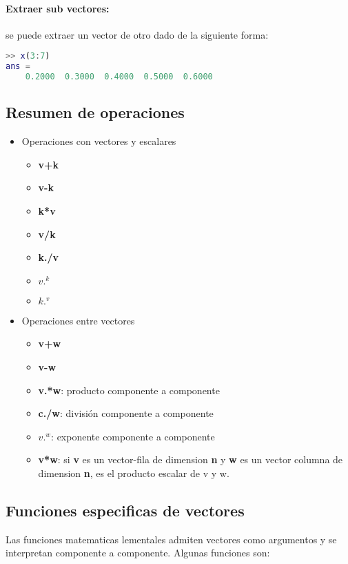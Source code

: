 \paragraph{Extraer sub vectores:} se puede extraer un vector de otro dado de la siguiente forma:
\begin{lstlisting}[language=Matlab]
>> x(3:7)
ans =
	0.2000	0.3000	0.4000	0.5000	0.6000
\end{lstlisting}

\subsection{Resumen de operaciones}

\begin{itemize}
\item Operaciones con vectores y escalares
\begin{itemize}
\item \textbf{v+k}
\item \textbf{v-k}
\item \textbf{k*v}
\item \textbf{v/k}
\item \textbf{k./v}
\item \textbf{$v.^k$}
\item \textbf{$k.^v$}
\end{itemize}

\item Operaciones entre vectores
\begin{itemize}
\item \textbf{v+w}
\item \textbf{v-w}
\item \textbf{v.*w}: producto componente a componente
\item \textbf{c./w}: división componente a componente
\item \textbf{$v.^w$}: exponente componente a componente
\item \textbf{v*w}: si \textbf{v} es un vector-fila de dimension \textbf{n} y \textbf{w} es un vector columna de dimension \textbf{n}, es el producto escalar de v y w.
\end{itemize}
\end{itemize}

\subsection{Funciones especificas de vectores}

Las funciones matematicas lementales admiten vectores como argumentos y se interpretan componente a componente. Algunas funciones son:


